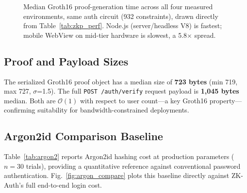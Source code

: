 \documentclass[journal,twoside,10pt]{IEEEtran}
\begin{document}
\begin{figure}[!t]
\centering
{}
\caption{Median Groth16 proof-generation time across all four measured
environments, same auth circuit (932 constraints), drawn directly from
Table~\ref{tab:zkp_perf}. Node.js (server/headless V8) is fastest; mobile
WebView on mid-tier hardware is slowest, a 5.8$\times$ spread.}
\label{fig:env_comparison}
\end{figure}

\subsection{Proof and Payload Sizes}

The serialized Groth16 proof object has a median size of \textbf{723 bytes}
(min 719, max 727, $\sigma$=1.5). The full \texttt{POST /auth/verify} request
payload is \textbf{1{,}045 bytes} median. Both are $\mathcal{O}(1)$ with
respect to user count---a key Groth16 property---confirming suitability for
bandwidth-constrained deployments.

\subsection{Argon2id Comparison Baseline}

Table~\ref{tab:argon2} reports Argon2id hashing cost at production
parameters ($n=30$ trials), providing a quantitative reference against
conventional password authentication. Fig.~\ref{fig:argon_compare} plots
this baseline directly against ZK-Auth's full end-to-end login cost.
\end{document}
